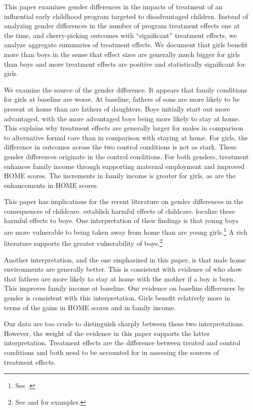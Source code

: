 This paper examines gender differences in the impacts of treatment of an influential early childhood program targeted to disadvantaged children. Instead of  analyzing gender differences in the number of program treatment effects one at the time, and cherry-picking outcomes with ``significant'' treatment effects, we analyze aggregate summaries of treatment effects. We document that girls benefit more than boys in the sense that effect sizes are generally much bigger for girls than boys and more treatment effects are positive and statistically significant for girls.

We examine the source of the gender difference. It appears that family conditions for girls at baseline are worse. At baseline, fathers of sons are more likely to be present at home than are fathers of daughters. Boys initially start out more advantaged, with the more advantaged boys being more likely to stay at home. This explains why treatment effects are generally larger for males in comparison to alternative formal care than in comparison with staying at home. For girls, the difference in outcomes across the two control conditions is not as stark. These gender differences originate in the control conditions. For both genders, treatment enhances family income through supporting maternal employment and improved HOME scores. The increments in family income is greater for girls, as are the enhancements in HOME scores.

This paper has implications for the recent literature on gender differences in the consequences of childcare. \citet{Baker_etal_2008_Universal_Childcare_JPE,Baker_Gruber_Milligan_2015_Noncog_Defects} establish harmful effects of childcare. \citet{Kottelenberg_Lehrer_2014_Gender-Effects} localize these harmful effects to boys. One interpretation of their findings is that young boys are more vulnerable to being taken away from home than are young girls.\footnote{See \citet{Garcia_etal_2019_ECE_IMHJ}.} A rich literature supports the greater vulnerability of boys.\footnote{See \citet{Golding_Fitzgerald_2017_IMHJ} and \citet{Schore_2017_IMHJ} for examples.}

Another interpretation, and the one emphasized in this paper, is that male home environments are generally better. This is consistent with evidence of \citet{Dahl_Moretti_2008_RES} who show that fathers are more likely to stay at home with the mother if a boy is born. This improves family income at baseline. Our evidence on baseline differences by gender is consistent with this interpretation. Girls benefit relatively more in terms of the gains in HOME scores and in family income.

Our data are too crude to distinguish sharply between these two interpretations. However, the weight of the evidence in this paper supports the latter interpretation. Treatment effects are the difference between treated and control conditions and both need to be accounted for in assessing the sources of treatment effects. 